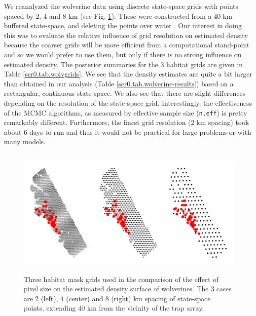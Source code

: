 We reanalyzed the wolverine data using discrete state-space grids with
points spaced by 2, 4 and 8 km (see
Fig. \ref{scr0.fig.wolvgrids}). These were constructed from a 40 km
buffered state-space, and deleting the points over water
\citep[see][]{royle_etal:2011jwm}.  Our interest in doing this was to
evaluate the relative influence of grid resolution on estimated
density because the coarser grids will be more efficient from a
computational stand-point and so we would prefer to use them, but
only if there is no strong influence on estimated density.
The posterior summaries  for the 3 habitat grids are given in Table \ref{scr0.tab.wolvgrids}.
We see that the density estimates are quite a bit larger than obtained in our
analysis
(Table \ref{scr0.tab.wolverine-results})
based on a rectangular, continuous state-space.
We also see that there are slight differences depending on the
resolution of the state-space grid.
Interestingly, the
effectiveness of the MCMC algorithms, as measured by effective sample
size (\mbox{\tt n.eff}) is pretty remarkably
different. Furthermore, the finest grid resolution ($2$ km spacing) took about
6 days to run and thus it would not be practical for large problems or
with many models.

\begin{figure}[ht]
\begin{center}
\includegraphics[height=2.5in,width=5in]{Ch5-SCR0/figs/wolvgrids}
\end{center}
\caption{Three habitat mask grids used in the comparison of the effect of pixel size on the estimated
  density surface of wolverines.  The 3 cases are
2 (left), 4 (center) and 8 (right) km spacing of state-space points, extending
40 km from the vicinity of the trap array. }
\label{scr0.fig.wolvgrids}
\end{figure}


